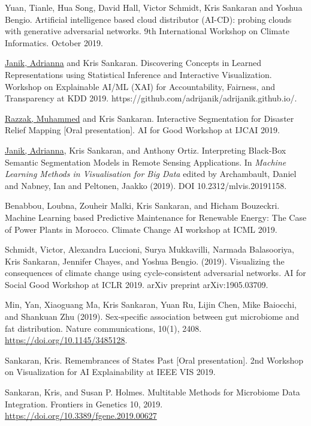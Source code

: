\documentclass[letterpaper]{article}
\renewenvironment{itemize}{
  \begin{list}{}{
    \setlength{\leftmargin}{1.5em}
  }
}{
  \end{list}
}
\begin{document}
\begin{itemize}
\item Yuan, Tianle, Hua Song, David Hall, Victor Schmidt, Kris Sankaran and
  Yoshua Bengio. Artificial intelligence based cloud distributor (AI-CD):
  probing clouds with generative adversarial networks. 9th International
  Workshop on Climate Informatics. October 2019.
\item \underline{Janik, Adrianna} and Kris Sankaran. Discovering Concepts in
Learned Representations using Statistical Inference and Interactive
Visualization. Workshop on Explainable AI/ML (XAI) for Accountability,
Fairness, and Transparency at KDD 2019.
https://github.com/adrijanik/adrijanik.github.io/.
\item \underline{Razzak, Muhammed} and Kris Sankaran. Interactive Segmentation
for Disaster Relief Mapping [Oral presentation]. AI for Good Workshop at IJCAI
2019.
\item \underline{Janik, Adrianna}, Kris Sankaran, and Anthony Ortiz.
Interpreting Black-Box Semantic Segmentation Models in Remote Sensing
Applications. In \textit{Machine Learning Methods in Visualisation for Big
Data} edited by Archambault, Daniel and Nabney, Ian and Peltonen, Jaakko
(2019). DOI 10.2312/mlvis.20191158.
\item Benabbou, Loubna, Zouheir Malki, Kris Sankaran, and Hicham Bouzeckri.
  Machine Learning based Predictive Maintenance for Renewable Energy: The Case
  of Power Plants in Morocco. Climate Change AI workshop at ICML 2019.
\item Schmidt, Victor, Alexandra Luccioni, Surya Mukkavilli, Narmada
  Balasooriya, Kris Sankaran, Jennifer Chayes, and Yoshua Bengio. (2019).
  Visualizing the consequences of climate change using cycle-consistent
  adversarial networks. AI for Social Good Workshop at ICLR 2019. arXiv
  preprint arXiv:1905.03709.
\item Min, Yan, Xiaoguang Ma, Kris Sankaran, Yuan Ru, Lijin Chen, Mike
  Baiocchi, and Shankuan Zhu (2019). Sex-specific association between gut
  microbiome and fat distribution. Nature communications, 10(1), 2408.
\href{https://doi.org/10.1145/3485128}{https://doi.org/10.1145/3485128}.
\item Sankaran, Kris. Remembrances of States Past [Oral presentation]. 2nd
  Workshop on Visualization for AI Explainability at IEEE VIS 2019.
\item Sankaran, Kris, and Susan P. Holmes. Multitable Methods for Microbiome
Data Integration. Frontiers in Genetics 10, 2019.
\href{https://doi.org/10.3389/fgene.2019.00627}{https://doi.org/10.3389/fgene.2019.00627}

\end{itemize}
\end{document}
